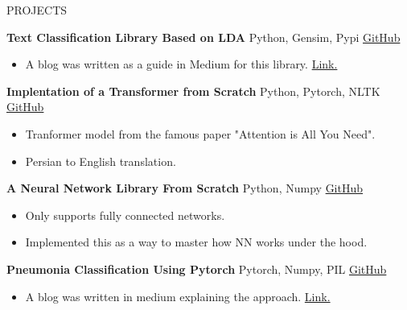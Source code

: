 \documentclass{resume} %
\begin{document}
	\begin{rSection}{PROJECTS}
		\vspace{-0.5em}
		\item \textbf{Text Classification Library Based on LDA} {Python, Gensim, Pypi} \hfill \href{https://github.com/FeryET/lda_classification}{GitHub}
		\begin{itemize}
			\item A blog was written as a guide in Medium for this library. \href{https://medium.com/analytics-vidhya/text-classification-using-lda-35d5b98d4f05}{Link.}
		\end{itemize}
		\vspace{3pt}
		
		\item \textbf{Implentation of a Transformer from Scratch} {Python, Pytorch, NLTK} \hfill \href{https://github.com/FeryET/persian-to-english-transformer}{GitHub}
		\begin{itemize}
			\item Tranformer model from the famous paper "Attention is All You Need".
			\item Persian to English translation.
		\end{itemize}
		\vspace{3pt}
		
		\item \textbf{A Neural Network Library From Scratch} {Python, Numpy} \hfill \href{https://github.com/FeryET/scratch_nn_lib}{GitHub}
		\begin{itemize}
			\item Only supports fully connected networks.
			\item Implemented this as a way to master how NN works under the hood.
		\end{itemize}
		
		\item \textbf{Pneumonia Classification Using Pytorch} {Pytorch, Numpy, PIL} \hfill \href{https://github.com/FeryET/pneumonia_analysis}{GitHub}
		\begin{itemize}
			\item A blog was written in medium explaining the approach.
			\href{https://medium.com/analytics-vidhya/a-cnn-to-classify-pneumonia-step-by-step-using-pytorch-13a90905abd7}{Link.}
		\end{itemize}
		
		
	\end{rSection} 
	
\end{document}
